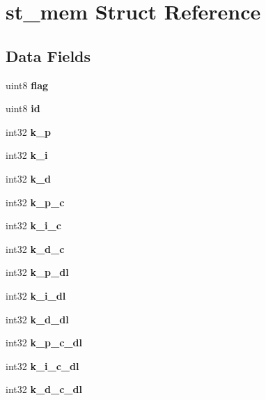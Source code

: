 \section{st\+\_\+mem Struct Reference}
\label{structst__mem}
\subsection*{Data Fields}
\begin{DoxyCompactItemize}
\item 
\mbox{\label{structst__mem_af11e40d15a1361229a78e772af5b3c94}} 
uint8 {\bfseries flag}
\item 
\mbox{\label{structst__mem_a492bfda30c3852a68b2cbfba9531e3d1}} 
uint8 {\bfseries id}
\item 
\mbox{\label{structst__mem_ad1bc394122aa9760c3fc2887a1891cd8}} 
int32 {\bfseries k\+\_\+p}
\item 
\mbox{\label{structst__mem_ad62fb8a39e2de160e14be47e3ff08014}} 
int32 {\bfseries k\+\_\+i}
\item 
\mbox{\label{structst__mem_ab9d15eaa4612dd1c5597e5634cd1d66c}} 
int32 {\bfseries k\+\_\+d}
\item 
\mbox{\label{structst__mem_ac3311db4a733f35aa5ed2672cb162f96}} 
int32 {\bfseries k\+\_\+p\+\_\+c}
\item 
\mbox{\label{structst__mem_a942ea80eb197a70dd0ba3da33d1e6c6e}} 
int32 {\bfseries k\+\_\+i\+\_\+c}
\item 
\mbox{\label{structst__mem_af32cf4ebfb30ad068ea530d03ff9a96f}} 
int32 {\bfseries k\+\_\+d\+\_\+c}
\item 
\mbox{\label{structst__mem_a047226f308f4365d9d0036d71b6ed910}} 
int32 {\bfseries k\+\_\+p\+\_\+dl}
\item 
\mbox{\label{structst__mem_ab5c86695ff730d3387a8c6b089945a7e}} 
int32 {\bfseries k\+\_\+i\+\_\+dl}
\item 
\mbox{\label{structst__mem_adc3d57142df06bc753d1982fa409ffea}} 
int32 {\bfseries k\+\_\+d\+\_\+dl}
\item 
\mbox{\label{structst__mem_a63c3f3c01d6757cafdb40043adce404e}} 
int32 {\bfseries k\+\_\+p\+\_\+c\+\_\+dl}
\item 
\mbox{\label{structst__mem_afc912f90d6ba2f39046a0daf0207f116}} 
int32 {\bfseries k\+\_\+i\+\_\+c\+\_\+dl}
\item 
\mbox{\label{structst__mem_af8bfba55a00d54c9c2a9e4bb11484158}} 
int32 {\bfseries k\+\_\+d\+\_\+c\+\_\+dl}
\item 
\mbox{\label{structst__mem_a96f2aec80e40c1bbe82186a4261ab7ac}} 

\end{DoxyCompactItemize}
